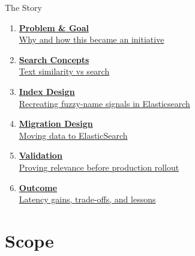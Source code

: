 \documentclass[aspectratio=169]{beamer}
\begin{document}
\begin{frame}{The Story}
  \vspace{0.2cm}
  \begin{enumerate}
    \item \hyperlink{sec:problem}{\textbf{Problem \& Goal}}\\[-0.02cm]
      \hyperlink{sec:problem}{{\small\textcolor{MutedText}{Why and how this became an initiative}}}
    \item \hyperlink{sec:search-concepts}{\textbf{Search Concepts}}\\[-0.02cm]
      \hyperlink{sec:search-concepts}{{\small\textcolor{MutedText}{Text similarity vs search}}}
    \item
    \hyperlink{sec:index-design}{\textbf{Index Design}}\\[-0.02cm]
      \hyperlink{sec:index-design}{{\small\textcolor{MutedText}{Recreating fuzzy-name signals in Elasticsearch}}}
    \item \hyperlink{sec:migration-design}{\textbf{Migration Design}}\\[-0.02cm]
      \hyperlink{sec:migration-design}{{\small\textcolor{MutedText}{Moving data to ElasticSearch}}}
    \item \hyperlink{sec:validation}{\textbf{Validation}}\\[-0.02cm]
      \hyperlink{sec:validation}{{\small\textcolor{MutedText}{Proving relevance before production rollout}}}
    \item \hyperlink{sec:outcome}{\textbf{Outcome}}\\[-0.02cm]
      \hyperlink{sec:outcome}{{\small\textcolor{MutedText}{Latency gains, trade-offs, and lessons}}}
  \end{enumerate}
\end{frame}

\section*{Scope}
\end{document}
